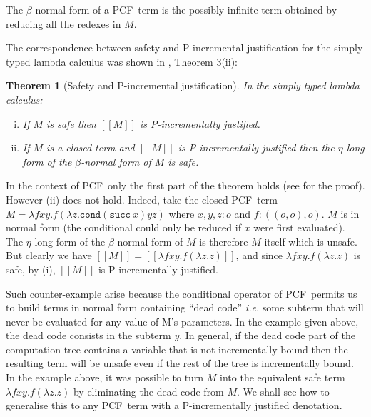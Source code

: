 \documentclass{article}
\newcommand{\sem}[1]{{[\![ #1 ]\!]}}
\newcommand\pcf{\textsf{PCF}}
\newcommand\pcfcond{\texttt{cond}}
\newcommand\pcfsucc{\texttt{succ}}
\newcommand\pcfpred{\texttt{pred}}
\newtheorem{theorem}{Theorem}[section]
\theoremstyle{remark}
\theoremstyle{definition}
\begin{document}
The $\beta$-normal form of a \pcf\ term is the possibly infinite term obtained by reducing all the redexes in $M$.



The correspondence between safety and P-incremental-justification for the simply typed lambda calculus was shown
in \cite{blumong:safelambdacalculus}, Theorem 3(ii):

\begin{theorem}[Safety and P-incremental justification]
\label{thm:safeincrejust} In the simply typed lambda calculus:
\begin{enumerate}[(i)]
\item If $M$ is safe then $\sem{M}$ is P-incrementally justified.
\item If $M$ is a closed term and $\sem{M}$ is
  P-incrementally justified then the $\eta$-long form of the
  $\beta$-normal form of $M$ is safe.
\end{enumerate}
\end{theorem}

In the context of \pcf\, only the first part of the theorem holds (see \cite{blumtransfer} for the proof). However (ii) does not hold. Indeed, take the closed \pcf\ term $M = \lambda f x y. f (\lambda z. \pcfcond (\pcfsucc\ x) y z )$ where $x,y,z:o$ and $f:((o,o),o)$. $M$ is in normal form (the conditional  could  only be reduced if $x$ were first evaluated). The $\eta$-long form of the $\beta$-normal form of $M$ is therefore $M$ itself which is unsafe.
But clearly we have $\sem{M} = \sem{\lambda f x y. f (\lambda z. z)}$, and since  $\lambda f x y. f (\lambda z. z)$ is safe, by (i), $\sem{M}$ is P-incrementally justified.

Such counter-example arise because the conditional operator
of \pcf\ permits us to build terms in normal form containing ``dead code'' {\it i.e.} some  subterm that will never be evaluated for any value of M's parameters. In the example given above, the dead code consists in the subterm $y$. In general, if the dead code part of the computation tree contains a variable that is not incrementally bound then the resulting term will be unsafe even if the rest of the tree is incrementally bound. 
In the example above, it was possible to turn $M$ into the equivalent safe term $\lambda f x y. f (\lambda z. z)$ by eliminating the dead code from $M$. 
We shall see how to generalise this to any \pcf\ term with a P-incrementally justified denotation. 
\end{document}
